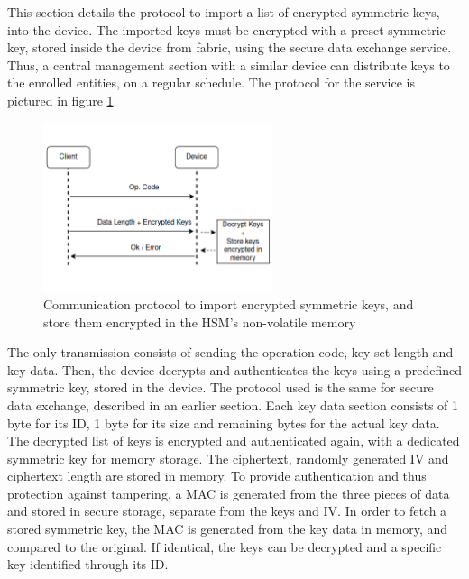This section details the protocol to import a list of encrypted symmetric keys, into the device.
The imported keys must be encrypted with a preset symmetric key, stored inside the device from fabric, using the secure data exchange service. Thus, a central management section with a similar device can distribute keys to the enrolled entities, on a regular schedule.
The protocol for the service is pictured in figure \ref{fig:protocol:import-keys}.

\begin{figure}[h!]
	\centering
	\includegraphics[width=0.60\textwidth]{./Images/import-keys.png}
	\caption{Communication protocol to import encrypted symmetric keys, and store them encrypted in the HSM's non-volatile memory}
	\label{fig:protocol:import-keys}
\end{figure}

The only transmission consists of sending the operation code, key set length and key data. Then, the device decrypts and authenticates the keys using a predefined symmetric key, stored in the device. The protocol used is the same for secure data exchange, described in an earlier section.
Each key data section consists of 1 byte for its ID, 1 byte for its size and remaining bytes for the actual key data.
The decrypted list of keys is encrypted and authenticated again, with a dedicated symmetric key for memory storage. The ciphertext, randomly generated IV and ciphertext length are stored in memory. To provide authentication and thus protection against tampering, a MAC is generated from the three pieces of data and stored in secure storage, separate from the keys and IV.
In order to fetch a stored symmetric key, the MAC is generated from the key data in memory, and compared to the original. If identical, the keys can be decrypted and a specific key identified through its ID.


